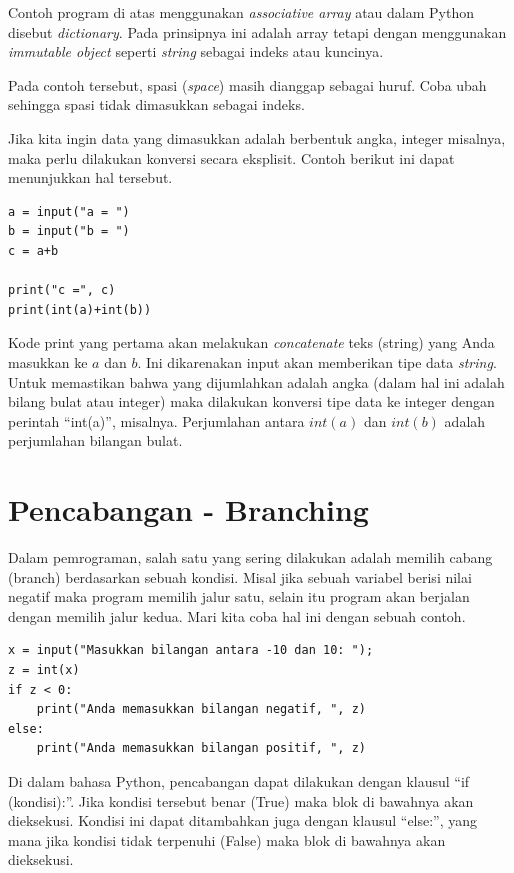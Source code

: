 Contoh program di atas menggunakan {\em associative array} atau dalam
Python disebut {\em dictionary}. Pada prinsipnya ini adalah array tetapi
dengan menggunakan {\em immutable object} seperti {\em string} sebagai
indeks atau kuncinya.

Pada contoh tersebut, spasi ({\em space}) masih dianggap sebagai huruf.
Coba ubah sehingga spasi tidak dimasukkan sebagai indeks.

Jika kita ingin data yang dimasukkan adalah berbentuk angka, integer misalnya,
maka perlu dilakukan konversi secara eksplisit.
Contoh berikut ini dapat menunjukkan hal tersebut.

\begin{verbatim}
a = input("a = ")
b = input("b = ")
c = a+b

print("c =", c)
print(int(a)+int(b))
\end{verbatim}

Kode print yang pertama akan melakukan {\em concatenate} teks (string) yang
Anda masukkan ke $a$ dan $b$. Ini dikarenakan input akan memberikan tipe 
data {\em string}.
Untuk memastikan bahwa yang dijumlahkan adalah angka (dalam hal ini adalah
bilang bulat atau integer) maka dilakukan konversi tipe data ke integer 
dengan perintah ``int(a)'', misalnya.
Perjumlahan antara $int(a)$ dan $int(b)$ adalah perjumlahan bilangan bulat.


\section{Pencabangan - Branching}
Dalam pemrograman, salah satu yang sering dilakukan adalah memilih cabang
(branch) berdasarkan sebuah kondisi. Misal jika sebuah variabel berisi
nilai negatif maka program memilih jalur satu, selain itu program akan
berjalan dengan memilih jalur kedua.
Mari kita coba hal ini dengan sebuah contoh.

\begin{verbatim}
x = input("Masukkan bilangan antara -10 dan 10: ");
z = int(x)
if z < 0:
    print("Anda memasukkan bilangan negatif, ", z)
else:
    print("Anda memasukkan bilangan positif, ", z)
\end{verbatim}

Di dalam bahasa Python, pencabangan dapat dilakukan dengan klausul
``if (kondisi):''. Jika kondisi tersebut benar (True) maka blok di
bawahnya akan dieksekusi.
Kondisi ini dapat ditambahkan juga dengan klausul ``else:'',
yang mana jika kondisi tidak terpenuhi (False) maka blok di bawahnya
akan dieksekusi.


